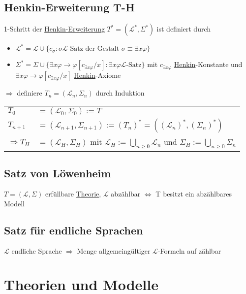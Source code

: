 \documentclass[12pt,a4paper]{article} %
\begin{document}
	\subsection{Henkin-Erweiterung T-H}
	1-Schritt der \hyperref[HenkinErweiterung]{Henkin-Erweiterung} $T^* = (\mathcal{L}^*, \Sigma^*)$ ist definiert durch
	\begin{itemize}
		\item $\mathcal{L}^* = \mathcal{L} \cup \{c_{\sigma} : \sigma \hyperref[LSatz]{\mathcal{L} \text{-Satz}} \text{ der Gestalt } \sigma \equiv \exists x  \varphi\}$
		\item $\Sigma^* = \Sigma \cup \{\exists x \varphi \rightarrow \varphi[c_{\exists x \varphi}/x] : \exists x \varphi \hyperref[LSatz]{\mathcal{L} \text{-Satz}}\}$ mit $c_{\exists x \varphi}$ \hyperref[Henkin]{Henkin}-Konstante und $\exists x \varphi \rightarrow \varphi[c_{\exists x \varphi}/x]$ \hyperref[Henkin]{Henkin}-Axiome 
	\end{itemize}
	$\Rightarrow$ definiere $T_n = (\mathcal{L}_n, \Sigma_n)$ durch Induktion \newline
	\begin{tabular}{l l}
		$T_0$ & $= (\mathcal{L}_0, \Sigma_0) := T$ \\
		$T_{n + 1}$ & $= (\mathcal{L}_{n + 1}, \Sigma_{n + 1}) := (T_n)^* = ((\mathcal{L}_n)^*, (\Sigma_n)^*)$ \\
		$\Rightarrow T_H$ & $= (\mathcal{L}_H, \Sigma_H)$ mit $\mathcal{L}_H := \bigcup\limits_{n \ge 0} \mathcal{L}_n$ und $\Sigma_H := \bigcup\limits_{n \ge 0} \Sigma_n$
	\end{tabular}
	
	\subsection{Satz von Löwenheim}
	$T = (\mathcal{L}, \Sigma)$ erfüllbare \hyperref[Theorie]{Theorie}, $\mathcal{L}$ abzählbar \newline
	$\Leftrightarrow$ T besitzt ein abzählbares Modell
	
	\subsection{Satz für endliche Sprachen}
	$\mathcal{L}$ endliche Sprache $\Rightarrow$ Menge allgemeingültiger $\mathcal{L}$-Formeln auf zählbar 
	
	\newpage
	\section{Theorien und Modelle}
\end{document}

